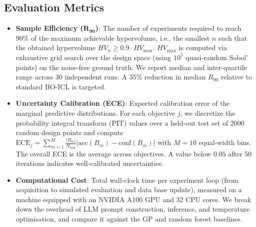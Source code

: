 \documentclass{article}
\begin{document}
\subsection{Evaluation Metrics}
\begin{itemize}
    \item \textbf{Sample Efficiency ($\mathbf{R_{90}}$)}: The number of experiments required to reach $90\%$ of the maximum achievable hypervolume, i.e., the smallest $n$ such that the obtained hypervolume $HV_n \ge 0.9 \cdot HV_{\text{max}}$. $HV_{\text{max}}$ is computed via exhaustive grid search over the design space (using $10^5$ quasi‑random Sobol’ points) on the noise‑free ground truth. We report median and inter‑quartile range across 30 independent runs. A $35\%$ reduction in median $R_{90}$ relative to standard BO-ICL is targeted.

    \item \textbf{Uncertainty Calibration (ECE)}: Expected calibration error of the marginal predictive distributions. For each objective $j$, we discretize the probability integral transform (PIT) values over a held‑out test set of 2000 random design points and compute $\text{ECE}_j = \sum_{m=1}^{M} \frac{|B_m|}{N_{\text{test}}} | \text{acc}(B_m) - \text{conf}(B_m) |$ with $M=10$ equal‑width bins. The overall ECE is the average across objectives. A value below $0.05$ after 50 iterations indicates well‑calibrated uncertainties.

    \item \textbf{Computational Cost}: Total wall‑clock time per experiment loop (from acquisition to simulated evaluation and data base update), measured on a machine equipped with an NVIDIA A100 GPU and 32 CPU cores. We break down the overhead of LLM prompt construction, inference, and temperature optimisation, and compare it against the GP and random forest baselines.
\end{itemize}
\end{document}
